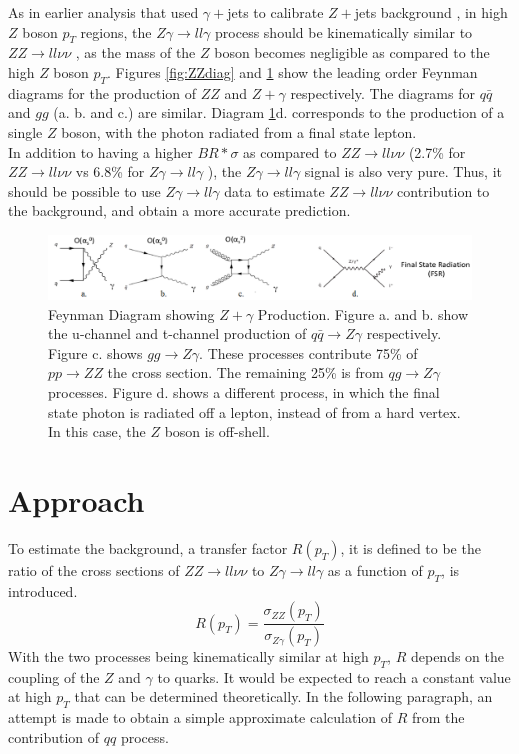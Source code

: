 \documentclass[11pt,a4paper,final]{report}
\newcommand{\ZZ}{$ZZ\to ll\nu\nu$ }
\newcommand{\Zgam}{$Z\gamma\to ll\gamma$ }
\begin{document}
As in earlier analysis that used $\gamma+$jets to calibrate $Z+$jets background \cite{gammajet}, in high $Z$ boson $p_T$ regions, the \Zgam process should be kinematically similar to \ZZ, as the mass of the $Z$ boson becomes negligible as compared to the high $Z$ boson $p_T$. Figures \ref{fig:ZZdiag} and \ref{fig:Zgdiag} show the leading order Feynman diagrams for the production of $ZZ$ and $Z+\gamma$ respectively. The diagrams for $q\bar{q}$ and $gg$ (a. b. and c.) are similar. Diagram \ref{fig:Zgdiag}d. corresponds to the production of a single $Z$ boson, with the photon radiated from a final state lepton.\\
In addition to having a higher $BR*\sigma$ as compared to \ZZ (2.7\% for \ZZ vs 6.8\% for \Zgam), the \Zgam signal is also very pure. Thus, it should be possible to use \Zgam data to estimate \ZZ contribution to the background, and obtain a more accurate prediction.
\begin{figure}[h]
	\begin{center}
		\includegraphics[width=\linewidth]{Zg.png}
		\caption{Feynman Diagram showing $Z+\gamma$ Production. Figure a. and b. show the u-channel and t-channel production of $q\bar{q}\to Z\gamma$ respectively. Figure c. shows $gg\to Z\gamma$. These processes contribute 75\% of $pp\to ZZ$ the cross section. The remaining 25\% is from $qg\to Z\gamma$ processes. Figure d. shows a different process, in which the final state photon is radiated off a lepton, instead of from a hard vertex. In this case, the $Z$ boson is off-shell.}
		\label{fig:Zgdiag}
	\end{center}
\end{figure}
\section{Approach}
To estimate the background, a transfer factor $R(p_T)$, it is defined to be the ratio of the cross sections of \ZZ to \Zgam as a function of $p_T$, is introduced.
\begin{equation}
	R(p_{T}) = \frac{\sigma_{ZZ}(p_{T})}{\sigma_{Z\gamma}(p_T)}
\end{equation}
With the two processes being kinematically similar at high $p_T$, $R$ depends on the coupling of the $Z$ and $\gamma$ to quarks. It would be expected to reach a constant value at high $p_T$ that can be determined theoretically. In the following paragraph, an attempt is made to obtain a simple approximate calculation of $R$ from the contribution of $qq$ process.
\end{document}
